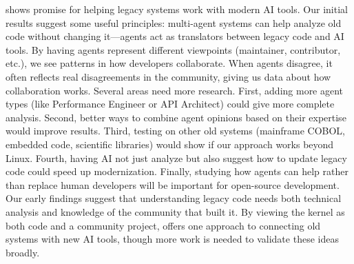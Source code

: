\sys shows promise for helping legacy systems work with modern AI tools. Our initial results suggest some useful principles: multi-agent systems can help analyze old code without changing it—agents act as translators between legacy code and AI tools. By having agents represent different viewpoints (maintainer, contributor, etc.), we see patterns in how developers collaborate. When agents disagree, it often reflects real disagreements in the community, giving us data about how collaboration works. Several areas need more research. First, adding more agent types (like Performance Engineer or API Architect) could give more complete analysis. Second, better ways to combine agent opinions based on their expertise would improve results. Third, testing \sys on other old systems (mainframe COBOL, embedded code, scientific libraries) would show if our approach works beyond Linux. Fourth, having AI not just analyze but also suggest how to update legacy code could speed up modernization. Finally, studying how agents can help rather than replace human developers will be important for open-source development. Our early findings suggest that understanding legacy code needs both technical analysis and knowledge of the community that built it. By viewing the kernel as both code and a community project, \sys offers one approach to connecting old systems with new AI tools, though more work is needed to validate these ideas broadly.

% 
% 